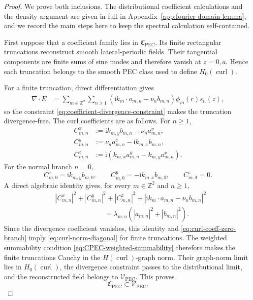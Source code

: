 \documentclass[11pt]{article}
\providecommand{\Z}{\mathbb{Z}}
\providecommand{\ii}{\mathrm{i}}
\providecommand{\abs}[1]{\left\lvert #1\right\rvert}
\providecommand{\paren}[1]{\left(#1\right)}
\providecommand{\VPEC}{\mathcal V_{\mathrm{PEC}}}
\providecommand{\Hcurl}{H(\operatorname{curl})}
\providecommand{\Hzcurl}{H_0(\operatorname{curl})}
\numberwithin{equation}{section}
\begin{document}
\begin{proof}
We prove both inclusions.  The distributional coefficient calculations and the
density argument are given in full in
Appendix~\ref{app:fourier-domain-lemma}, and we record the main steps here to
keep the spectral calculation self-contained.

First suppose that a coefficient family lies in \(\mathfrak C_{\mathrm{PEC}}\).  Its finite rectangular truncations reconstruct smooth lateral-periodic fields.  Their tangential components are finite sums of sine modes and therefore vanish at \(z=0,a\).  Hence each truncation belongs to the smooth PEC class used to define \(\Hzcurl\).

For a finite truncation, direct differentiation gives
\begin{align}
\label{eq:div-coeff-finite}
    \nabla\cdot E
    &=
    \sum_{m\in\Z^2}\sum_{n\ge1}
    \paren{\ii k_m\cdot a_{m,n}-\nu_n b_{m,n}}
    \phi_m(r)s_n(z),
\end{align}
so the constraint \eqref{eq:coefficient-divergence-constraint} makes the truncation divergence-free.
The curl coefficients are as follows.  For \(n\ge1\),
\begin{align}
\label{eq:curl-coeff-x}
    C^x_{m,n}&:=\ii k_{m,y} b_{m,n}-\nu_n a^y_{m,n},\nonumber\\
    C^y_{m,n}&:=\nu_n a^x_{m,n}-\ii k_{m,x} b_{m,n},\\
    C^z_{m,n}&:=\ii\paren{k_{m,x}a^y_{m,n}-k_{m,y}a^x_{m,n}}.\nonumber
\end{align}
For the normal branch \(n=0\),
\begin{equation}
\label{eq:curl-coeff-zero-branch}
    C^x_{m,0}=\ii k_{m,y}b_{m,0},
    \qquad
    C^y_{m,0}=-\ii k_{m,x}b_{m,0},
    \qquad
    C^z_{m,0}=0 .
\end{equation}
A direct algebraic identity gives, for every \(m\in\Z^2\) and \(n\ge1\),
\begin{align}
\label{eq:curl-div-algebraic-identity}
    &\abs{C^x_{m,n}}^2+
     \abs{C^y_{m,n}}^2+
     \abs{C^z_{m,n}}^2+
     \abs{\ii k_m\cdot a_{m,n}-\nu_n b_{m,n}}^2  \\
    &\hspace{3cm}=
     \lambda_{m,n}
     \paren{\abs{a_{m,n}}^2+\abs{b_{m,n}}^2} .\nonumber
\end{align}
Since the divergence coefficient vanishes, this identity and \eqref{eq:curl-coeff-zero-branch} imply \eqref{eq:curl-norm-diagonal} for finite truncations.  The weighted summability condition \eqref{eq:CPEC-weighted-summability} therefore makes the finite truncations Cauchy in the \(\Hcurl\)-graph norm.  Their graph-norm limit lies in \(\Hzcurl\), the divergence constraint passes to the distributional limit, and the reconstructed field belongs to \(\VPEC\).  This proves
\[
    \mathfrak C_{\mathrm{PEC}}\subset\VPEC .
\]


\end{proof}
\end{document}
